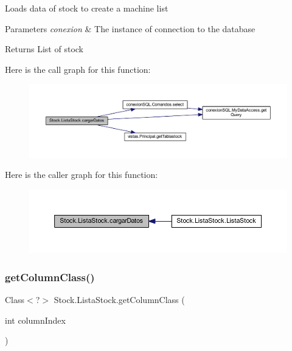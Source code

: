 Loads data of stock to create a machine list 
\begin{DoxyParams}{Parameters}
{\em conexion} & The instance of connection to the database \\
\hline
\end{DoxyParams}
\begin{DoxyReturn}{Returns}
List of stock 
\end{DoxyReturn}
Here is the call graph for this function\+:
\nopagebreak
\begin{figure}[H]
\begin{center}
\leavevmode
\includegraphics[width=350pt]{class_stock_1_1_lista_stock_ae43d6e1304e10935ed275f770f6fd743_cgraph}
\end{center}
\end{figure}
Here is the caller graph for this function\+:
\nopagebreak
\begin{figure}[H]
\begin{center}
\leavevmode
\includegraphics[width=350pt]{class_stock_1_1_lista_stock_ae43d6e1304e10935ed275f770f6fd743_icgraph}
\end{center}
\end{figure}
\mbox{\label{class_stock_1_1_lista_stock_a18471e9271be7455310d9a277337c38e}} 
\subsubsection{\texorpdfstring{get\+Column\+Class()}{getColumnClass()}}
{\footnotesize\ttfamily Class$<$?$>$ Stock.\+Lista\+Stock.\+get\+Column\+Class (\begin{DoxyParamCaption}\item[{int}]{column\+Index }\end{DoxyParamCaption})}

